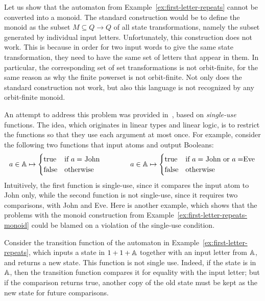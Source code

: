 \documentclass[a4paper,UKenglish,cleveref, autoref, numberwithinsect, thm-restate]{lipics-v2021}
\begin{document}
\begin{example}\label{ex:first-letter-repeats-monoid}
    Let us show that the  automaton from Example~\ref{ex:first-letter-repeats} cannot be converted into a monoid. The standard construction would be to define the monoid as the subset $M \subseteq Q \to Q$ of all state transformations, namely the subset generated by individual input letters. 
    Unfortunately, this construction does not work. This is because in order  for  two input words to give the same state transformation, they need to have the same set of letters that appear in them. In particular, the corresponding set of set transformations is not orbit-finite, for the same reason as why the finite powerset is not orbit-finite. Not only does the standard construction not work, but also this language is not recognized by any orbit-finite monoid.\exampleend
\end{example}


An attempt to address this problem was provided in~\cite{stefanski-phd,bojanczykstefanski2020}, based on \emph{single-use} functions. The idea, which originates in linear types and linear logic,  is to restrict the functions so that they use each argument at most once. For example, consider the following two functions that input atoms and output Booleans:
\begin{align*}
a \in \mathbb A \mapsto 
\begin{cases}
    \text{true} & \text{if $a=$ John}\\
    \text{false} & \text{otherwise}
\end{cases}
\qquad \qquad 
a \in \mathbb A \mapsto 
\begin{cases}
    \text{true} & \text{if $a=$ John or $a = $Eve}\\
    \text{false} & \text{otherwise}
\end{cases}
\end{align*}
Intuitively, the first function is single-use, since it compares the input atom to John only, while the second function is not single-use, since it requires two comparisons, with John and Eve. Here is another example, which shows that the problems with the monoid construction from Example~\ref{ex:first-letter-repeats-monoid} could be blamed on a violation of the single-use condition.
\begin{example}
    Consider  the transition function of the automaton in Example~\ref{ex:first-letter-repeats}, which inputs a state in $1 + 1 + \mathbb A$ together with an input letter from $\mathbb A$, and returns a new state.  This function is not single use. Indeed, if the state is in $\mathbb A$, then the transition function compares it for equality with the input letter; but if the comparison returns true, another copy of the old state must be kept as the new state for future comparisons. \exampleend
\end{example}
\end{document}
